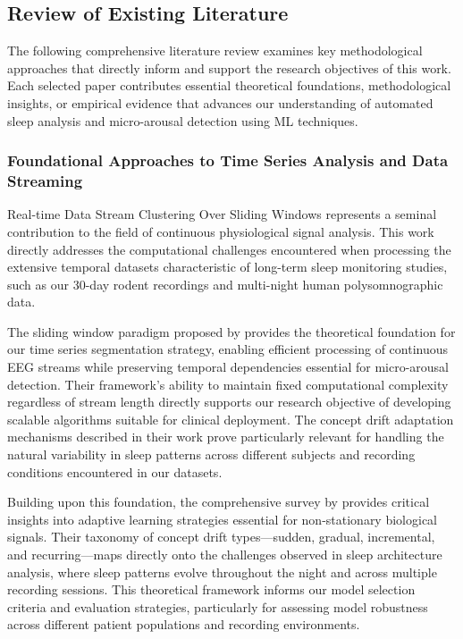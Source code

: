 \documentclass[a4paper,12pt,twoside]{article}
\begin{document}
\subsection{Review of Existing Literature}

The following comprehensive literature review examines key methodological approaches that directly inform and support the research objectives of this work. Each selected paper contributes essential theoretical foundations, methodological insights, or empirical evidence that advances our understanding of automated sleep analysis and micro-arousal detection using ML techniques.

\subsubsection{Foundational Approaches to Time Series Analysis and Data Streaming}

Real-time Data Stream Clustering Over Sliding Windows \cite{aggarwal2003framework} represents a seminal contribution to the field of continuous physiological signal analysis. This work directly addresses the computational challenges encountered when processing the extensive temporal datasets characteristic of long-term sleep monitoring studies, such as our 30-day rodent recordings and multi-night human polysomnographic data.

The sliding window paradigm proposed by \citeauthor{aggarwal2003framework} provides the theoretical foundation for our time series segmentation strategy, enabling efficient processing of continuous EEG streams while preserving temporal dependencies essential for micro-arousal detection. Their framework's ability to maintain fixed computational complexity regardless of stream length directly supports our research objective of developing scalable algorithms suitable for clinical deployment. The concept drift adaptation mechanisms described in their work prove particularly relevant for handling the natural variability in sleep patterns across different subjects and recording conditions encountered in our datasets.

Building upon this foundation, the comprehensive survey by \citeauthor{gama2014survey} \cite{gama2014survey} provides critical insights into adaptive learning strategies essential for non-stationary biological signals. Their taxonomy of concept drift types—sudden, gradual, incremental, and recurring—maps directly onto the challenges observed in sleep architecture analysis, where sleep patterns evolve throughout the night and across multiple recording sessions. This theoretical framework informs our model selection criteria and evaluation strategies, particularly for assessing model robustness across different patient populations and recording environments.
\end{document}
